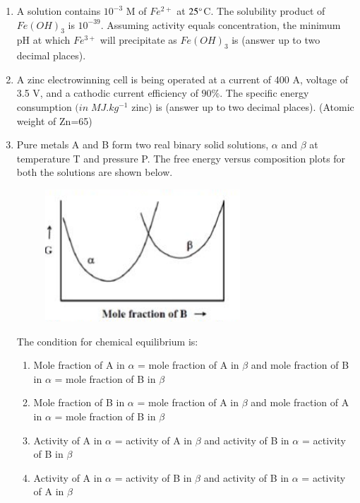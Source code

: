 \documentclass[journal]{IEEEtran}
\theoremstyle{remark}
\begin{document}
\begin{enumerate}
\item A solution contains $10^{-3}$ M of $Fe^{2+}$ at $25\degree$C. The solubility product of $Fe(OH)_3$ is $10^{-39}$. Assuming activity equals concentration, the minimum pH at which $Fe^{3+}$ will precipitate as $Fe(OH)_3$ is\underline {\hspace{2cm}} (answer up to two decimal places). \hfill{}

\item A zinc electrowinning cell is being operated at a current of 400 A, voltage of 3.5 V, and a cathodic current efficiency of $90\%$. The specific energy consumption $(in \;MJ.kg^{-1}$ zinc) is \underline {\hspace{2cm}} (answer up to two decimal places). (Atomic weight of Zn=65) \hfill{}

\item Pure metals A and B form two real binary solid solutions, $\alpha$ and $\beta$ at temperature T and pressure P. The free energy versus composition plots for both the solutions are shown below.
\begin{figure}[H]
    \centering
    \includegraphics[width=0.4\columnwidth]{figs/Q.41.png}
    \caption{}
    \label{fig:placeholder}
\end{figure}
The condition for chemical equilibrium is: \hfill{}
\begin{enumerate}
    \item Mole fraction of A in $\alpha$ = mole fraction of A in $\beta$ and mole fraction of B in $\alpha$ = mole fraction of B in $\beta$
    \item Mole fraction of B in $\alpha$ = mole fraction of A in $\beta$ and mole fraction of A in $\alpha$ = mole fraction of B in $\beta$
    \item Activity of A in $\alpha$ = activity of A in $\beta$ and activity of B in $\alpha$ = activity of B in $\beta$
    \item Activity of A in $\alpha$ = activity of B in $\beta$ and activity of B in $\alpha$ = activity of A in $\beta$
\end{enumerate}


\end{enumerate}
\end{document}
